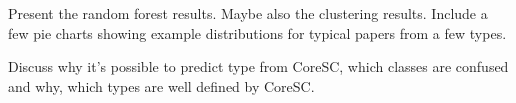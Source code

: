 \documentclass{svmult}
\begin{document}
Present the random forest results. Maybe also the clustering results. Include a few pie charts showing example distributions for typical papers from a few types. 

Discuss why it's possible to predict type from CoreSC, which classes are confused and why, which types are well defined by CoreSC. 







%
%


\end{document}
